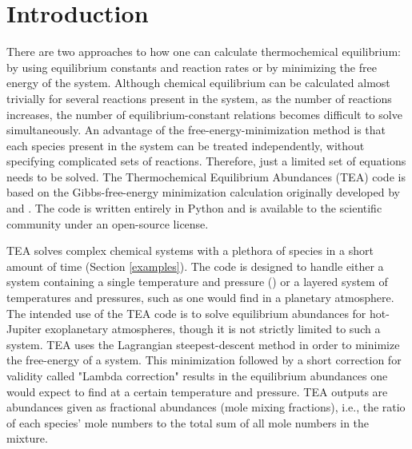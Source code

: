 \newpage
\tableofcontents
\newpage

\section{Introduction}
\label{intro}

  There are two approaches to how one can calculate thermochemical
  equilibrium: by using equilibrium constants and reaction rates or by
  minimizing the free energy of the system. Although chemical
  equilibrium can be calculated almost trivially for several reactions
  present in the system, as the number of reactions increases, the
  number of equilibrium-constant relations becomes difficult to solve
  simultaneously.  An advantage of the free-energy-minimization method
  is that each species present in the system can be treated
  independently, without specifying complicated sets of reactions.
  Therefore, just a limited set of equations needs to be solved. The
  Thermochemical Equilibrium Abundances (TEA) code is based on the
  Gibbs-free-energy minimization calculation originally developed
  by \citet{WhiteJohnsonDantzig1958JGibbs}
  and \citet{Eriksson1971}. The code is written entirely in Python and
  is available to the scientific community under an open-source
  license.


  TEA solves complex chemical systems with a plethora of species in a
  short amount of time (Section \ref{examples}).  The code is designed
  to handle either a system containing a single temperature and
  pressure () or a layered system of temperatures and
  pressures, such as one would find in a planetary atmosphere.  The
  intended use of the TEA code is to solve equilibrium abundances for
  hot-Jupiter exoplanetary atmospheres, though it is not strictly
  limited to such a system. TEA uses the Lagrangian steepest-descent
  method \citep[Section 1.2] {BlecicEtal2015-TEAtheory} in order to
  minimize the free-energy of a system.  This minimization followed by
  a short correction for validity called "Lambda
  correction" \citep[Section 4]{BlecicEtal2015-TEAtheory} results in
  the equilibrium abundances one would expect to find at a certain
  temperature and pressure. TEA outputs are abundances given as
  fractional abundances (mole mixing fractions), i.e., the ratio of
  each species' mole numbers to the total sum of all mole numbers in
  the mixture.


